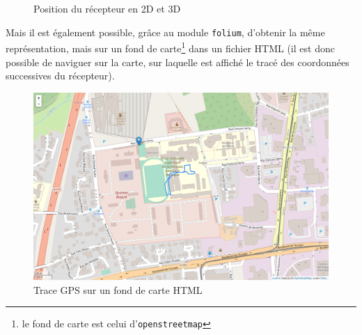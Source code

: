 \begin{figure}[h]
\begin{subfigure}[h]{.45\textwidth}
          \end{subfigure}
          \caption{Position du récepteur en 2D et 3D}
          \label{fig:plot-coords}
      \end{figure}

      Mais il est également possible, grâce au module \texttt{folium}, d'obtenir la même représentation, mais sur un fond de carte\footnote{le fond de carte est celui d'\texttt{openstreetmap}} dans un fichier HTML (il est donc possible de naviguer sur la carte, sur laquelle est affiché le tracé des coordonnées successives du récepteur).

      \begin{figure}[h]
          \centering
          \includegraphics[width=.9\textwidth]{imgs/gps_map}
          \caption{Trace GPS sur un fond de carte HTML}
          \label{fig:coords-on-map}
      \end{figure}

